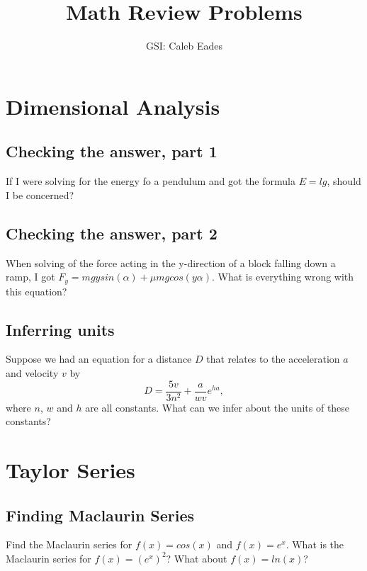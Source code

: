 \documentclass{article}
\begin{document}
	
\title{Math Review Problems}
\author{GSI: Caleb Eades}
\maketitle

\section{Dimensional Analysis}

\subsection{Checking the answer, part 1}

If I were solving for the energy fo a pendulum and got the formula $E=lg$, should I be concerned?

\subsection{Checking the answer, part 2}

When solving of the force acting in the y-direction of a block falling down a ramp, I got $F_y=mgysin(\alpha) + \mu mgcos(y\alpha)$. What is everything wrong with this equation?

\subsection{Inferring units}

Suppose we had an equation for a distance $D$ that relates to the acceleration $a$ and velocity $v$ by
\begin{equation}
D = \frac{5v}{3n^2} + \frac{a}{wv}e^{ha},
\end{equation}
where $n$, $w$ and $h$ are all constants. What can we infer about the units of these constants?

\newpage

\section{Taylor Series}

\subsection{Finding Maclaurin Series}

Find the Maclaurin series for $f(x) = cos(x)$ and $f(x)=e^x$. What is the Maclaurin series for $f(x)=(e^x)^2$? What about $f(x)=ln(x)$?
\end{document}
